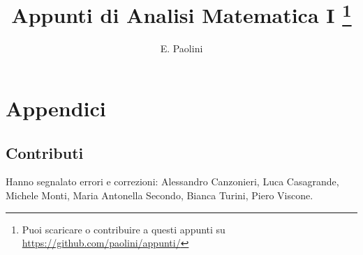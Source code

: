 \documentclass[italian,a4paper,oneside,headinclude]{scrbook}
\title{Appunti di Analisi Matematica I%
\thanks{%
Puoi scaricare o contribuire a questi appunti su
\url{https://github.com/paolini/appunti/}}}
\author{E. Paolini}
\begin{document}
\maketitle

\tableofcontents









\backmatter
\chapter{Appendici}


\section{Contributi}

Hanno segnalato errori e correzioni:
Alessandro Canzonieri,
Luca Casagrande,
Michele Monti,
Maria Antonella Secondo,
Bianca Turini,
Piero Viscone.
% 
% 

\printindex
\end{document}
